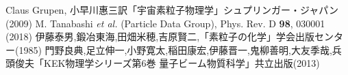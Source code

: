 \documentclass[dvipdfmx]{jsarticle}
\begin{document}



\begin{thebibliography}{10}
     Claus Grupen, 小早川惠三訳「宇宙素粒子物理学」シュプリンガー・ジャパン(2009)
     M. Tanabashi \textit{et al.} (Particle Data Group), Phys. Rev. D \textbf{98}, 030001 (2018)
     伊藤泰男,鍛冶東海,田畑米穂,吉原賢二,「素粒子の化学」学会出版センター(1985)
     門野良典,足立伸一,小野寛太,稲田康宏,伊藤晋一,鬼柳善明,大友季哉,兵頭俊夫「KEK物理学シリーズ第6巻 量子ビーム物質科学」共立出版(2013)
\end{thebibliography}
\end{document}
